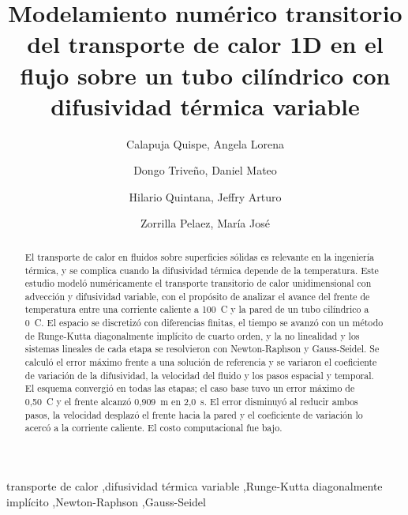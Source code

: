 \documentclass[final,5p,times,twocolumn,authoryear,11pt]{elsarticle}
\begin{document}
\begin{frontmatter}

\title{Modelamiento numérico transitorio del transporte de calor 1D en el flujo sobre un tubo cilíndrico con difusividad térmica variable}

\author[utec]{Calapuja Quispe, Angela Lorena}

\author[utec]{Dongo Triveño, Daniel Mateo}

\author[utec]{Hilario Quintana, Jeffry Arturo}

\author[utec]{Zorrilla Pelaez, María José}


\begin{abstract}
El transporte de calor en fluidos sobre superficies sólidas es relevante en la ingeniería térmica, y se complica cuando la difusividad térmica depende de la temperatura. Este estudio modeló numéricamente el transporte transitorio de calor unidimensional con advección y difusividad variable, con el propósito de analizar el avance del frente de temperatura entre una corriente caliente a 100~\textdegree C y la pared de un tubo cilíndrico a 0~\textdegree C. El espacio se discretizó con diferencias finitas, el tiempo se avanzó con un método de Runge-Kutta diagonalmente implícito de cuarto orden, y la no linealidad y los sistemas lineales de cada etapa se resolvieron con Newton-Raphson y Gauss-Seidel. Se calculó el error máximo frente a una solución de referencia y se variaron el coeficiente de variación de la difusividad, la velocidad del fluido y los pasos espacial y temporal. El esquema convergió en todas las etapas; el caso base tuvo un error máximo de 0,50~\textdegree C y el frente alcanzó 0,909~m en 2,0~s. El error disminuyó al reducir ambos pasos, la velocidad desplazó el frente hacia la pared y el coeficiente de variación lo acercó a la corriente caliente. El costo computacional fue bajo.
\end{abstract}

\begin{keyword}
transporte de calor \sep difusividad térmica variable \sep Runge-Kutta diagonalmente implícito \sep Newton-Raphson \sep Gauss-Seidel
\end{keyword}

\end{frontmatter}
\end{document}
